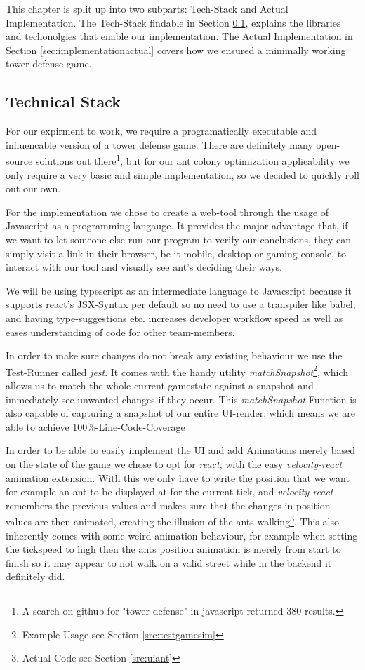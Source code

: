 This chapter is split up into two subparts: Tech-Stack and Actual Implementation. The Tech-Stack findable in Section \ref{sec:implementationtech}, explains the libraries and techonolgies that enable our implementation. The Actual Implementation in Section \ref{sec:implementationactual} covers how we ensured a minimally working tower-defense game.

\subsection{Technical Stack}
\label{sec:implementationtech}
For our expirment to work, we require a programatically executable and influencable version of a tower defense game. There are definitely many open-source solutions out there\footnote{A search on github for "tower defense" in javascript returned 380 results.\cite{githubtowerdef}}, but for our ant colony optimization applicability we only require a very basic and simple implementation, so we decided to quickly roll out our own.

For the implementation we chose to create a web-tool through the usage of Javascript as a programming langauge. It provides the major advantage that, if we want to let someone else run our program to verify our conclusions, they can simply visit a link in their browser, be it mobile, desktop or gaming-console, to interact with our tool and visually see ant's deciding their ways\cite{curran2012future}.

We will be using typescript\cite{libstypescript} as an intermediate language to Javacsript because it supports react's JSX-Syntax per default so no need to use a transpiler like babel, and having type-suggestions etc. increases developer workflow speed as well as eases understanding of code for other team-members.

In order to make sure changes do not break any existing behaviour we use the Test-Runner called \textit{jest}\cite{libsjest}. It comes with the handy utility  \textit{matchSnapshot}\footnote{Example Usage see Section \ref{src:testgamesim}}, which allows us to match the whole current gamestate against a snapshot and immediately see unwanted changes if they occur. This \textit{matchSnapshot}-Function is also capable of capturing a snapshot of our entire UI-render, which means we are able to achieve 100\%-Line-Code-Coverage

In order to be able to easily implement the UI and add Animations merely based on the state of the game we chose to opt for \textit{react}\cite{libsreact}, with the easy \textit{velocity-react}\cite{libsreactvelocity} animation extension. With this we only have to write the position that we want for example an ant to be displayed at for the current tick, and \textit{velocity-react} remembers the previous values and makes sure that the changes in position values are then animated, creating the illusion of the ants walking\footnote{Actual Code see Section \ref{src:uiant}}. This also inherently comes with some weird animation behaviour, for example when setting the tickspeed to high then the ants position animation is merely from start to finish so it may appear to not walk on a valid street while in the backend it definitely did.

